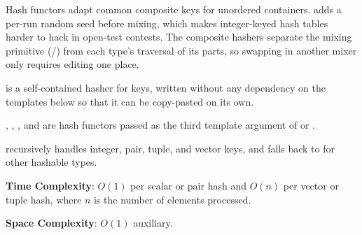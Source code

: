 Hash functors adapt common composite keys for unordered containers.  adds a per-run random seed before mixing, which makes integer-keyed hash tables harder to hack in open-test contests. The composite hashers separate the mixing primitive (/) from each type's traversal of its parts, so swapping in another mixer only requires editing one place.

\begin{compactitem}
  \item {} is a self-contained hasher for  keys, written without any dependency on the templates below so that it can be copy-pasted on its own.
  \item {}, , , and  are hash functors passed as the third template argument of  or .
  \item {} recursively handles integer, pair, tuple, and vector keys, and falls back to  for other hashable types.
\end{compactitem}

\textbf{Time Complexity}: $O(1)$ per scalar or pair hash and $O(n)$ per vector or tuple hash, where $n$ is the number of elements processed.

\textbf{Space Complexity}: $O(1)$ auxiliary.

